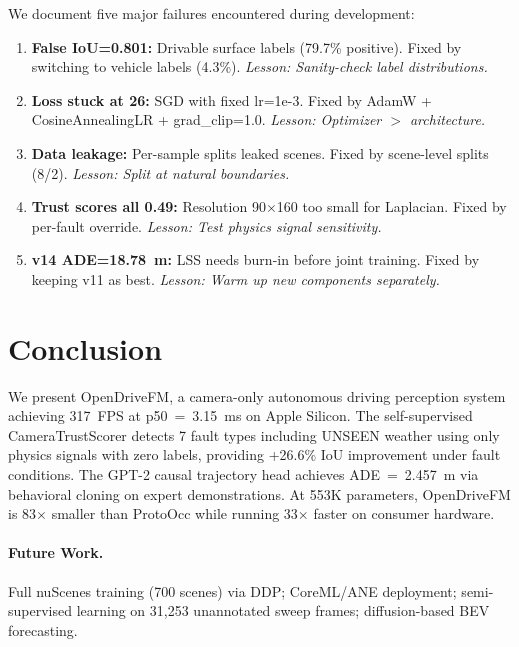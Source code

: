 \documentclass[10pt,twocolumn]{article}
\begin{document}
We document five major failures encountered during development:

\begin{enumerate}[leftmargin=*,topsep=2pt,itemsep=2pt]
  \item \textbf{False IoU=0.801:} Drivable surface labels (79.7\%
        positive). Fixed by switching to vehicle labels (4.3\%).
        \textit{Lesson: Sanity-check label distributions.}

  \item \textbf{Loss stuck at 26:} SGD with fixed lr=1e-3.
        Fixed by AdamW + CosineAnnealingLR + grad\_clip=1.0.
        \textit{Lesson: Optimizer $>$ architecture.}

  \item \textbf{Data leakage:} Per-sample splits leaked scenes.
        Fixed by scene-level splits (8/2).
        \textit{Lesson: Split at natural boundaries.}

  \item \textbf{Trust scores all 0.49:} Resolution 90$\times$160
        too small for Laplacian. Fixed by per-fault override.
        \textit{Lesson: Test physics signal sensitivity.}

  \item \textbf{v14 ADE=18.78~m:} LSS needs burn-in before joint
        training. Fixed by keeping v11 as best.
        \textit{Lesson: Warm up new components separately.}
\end{enumerate}

\section{Conclusion}

We present OpenDriveFM, a camera-only autonomous driving perception
system achieving 317~FPS at p50~=~3.15~ms on Apple Silicon.
The self-supervised CameraTrustScorer detects 7 fault types including
UNSEEN weather using only physics signals with zero labels, providing
+26.6\% IoU improvement under fault conditions.
The GPT-2 causal trajectory head achieves ADE~=~2.457~m via
behavioral cloning on expert demonstrations.
At 553K parameters, OpenDriveFM is 83$\times$ smaller than ProtoOcc
while running 33$\times$ faster on consumer hardware.

\paragraph{Future Work.}
Full nuScenes training (700 scenes) via DDP; CoreML/ANE deployment;
semi-supervised learning on 31,253 unannotated sweep frames;
diffusion-based BEV forecasting.
\end{document}
